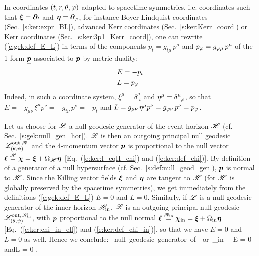 In coordinates $(t,r,\theta,\varphi)$ adapted to spacetime symmetries,
i.e. coordinates such that $\bm{\xi} = \bm{\partial}_t$ and $\bm{\eta}=\bm{\partial}_\varphi$,
for instance Boyer-Lindquist coordinates (Sec.~\ref{s:ker:expr_BL}),
advanced Kerr coordinates (Sec.~\ref{s:ker:Kerr_coord}) or Kerr coordinates
(Sec.~\ref{s:ker:3p1_Kerr_coord}), one can rewrite
(\ref{e:gek:def_E_L})
in terms of the components $p_t = g_{t\mu} \, p^\mu$ and $p_\varphi = g_{\varphi\mu} \, p^\mu$
of the 1-form $\underline{\bm{p}}$ associated to $\bm{p}$ by metric duality:
\begin{subequations}
\label{e:gek:E_pt_L_pph}
\begin{align}
& E = - p_t \\
& L = p_\varphi
\end{align}
\end{subequations}
Indeed, in such a coordinate system, $\xi^\mu =  \delta^\mu_{\ \, t}$
and $\eta^\mu = \delta^\mu_{\ \, \varphi}$, so that $E = -g_{\mu\nu} \, \xi^\mu p^\nu = -g_{t\nu} \, p^\nu = -p_t$
and $L = g_{\mu\nu} \, \eta^\mu p^\nu = g_{\varphi\nu} \, p^\nu = p_\varphi$.

\begin{example} \label{x:gek:null_generator_hor}
Let us choose for $\mathscr{L}$ a null geodesic generator of the event horizon $\mathscr{H}$
(cf. Sec.~\ref{s:gek:null_gen_hor}). $\mathscr{L}$ is then an outgoing principal null
geodesic $\mathscr{L}^{{\rm out},\mathscr{H}}_{(\theta,\psi)}$
and the 4-momentum vector $\bm{p}$ is proportional to the null vector
$\bm{\ell} \stackrel{\mathscr{H}}{=} \bm{\chi} = \bm{\xi} + \Omega_{\mathscr{H}} \bm{\eta}$ [Eq.~(\ref{e:ker:l_eqH_chi})
and (\ref{e:ker:def_chi})].
By definition of a
generator of a null hypersurface (cf. Sec.~\ref{s:def:null_geod_gen}),
$\bm{p}$ is normal to $\mathscr{H}$. Since the Killing vector fields $\bm{\xi}$ and $\bm{\eta}$
are tangent to $\mathscr{H}$ (for $\mathscr{H}$ is globally preserved by the
spacetime symmetries), we get immediately from
the definitions (\ref{e:gek:def_E_L}) $E=0$ and $L=0$.
Similarly, if $\mathscr{L}$ is a null geodesic generator of the
inner horizon $\mathscr{H}_{\rm in}$, $\mathscr{L}$ is an outgoing principal null
geodesic $\mathscr{L}^{{\rm out},\mathscr{H}_{\rm in}}_{(\theta,\psi)}$, with $\bm{p}$ proportional to
the null normal
$\bm{\ell} \stackrel{\mathscr{H}_{\rm in}}{=} \bm{\chi}_{\rm in} = \bm{\xi} + \Omega_{\rm in} \bm{\eta}$
[Eq.~(\ref{e:ker:chi_in_ell}) and (\ref{e:ker:def_chi_in})], so that we
have $E=0$ and $L=0$ as well. Hence we conclude:
\be \label{e:gek:generator_hor_E_L_zero}
    \Li \ \mbox{null geodesic generator of}\ \Hor\ \mbox{or}\ \Hor_{\rm in}
   \  \Longrightarrow\  E = 0 \quad\mbox{and}\quad L = 0 .
\ee
\end{example}

